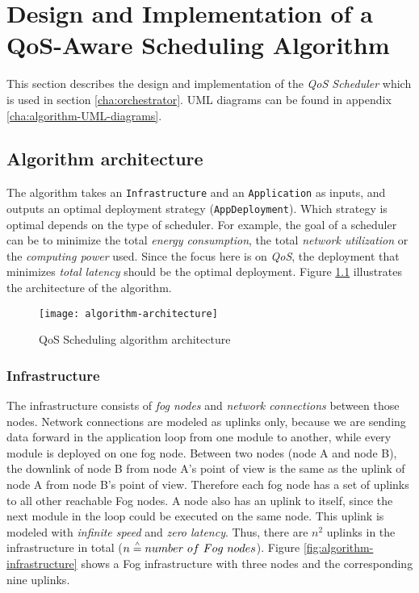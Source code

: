 \chapter{Design and Implementation of a QoS-Aware Scheduling Algorithm\label{cha:algorithm}}

This section describes the design and implementation of the \textit{QoS Scheduler} which is used in section \ref{cha:orchestrator}. UML diagrams can be found in appendix \ref{cha:algorithm-UML-diagrams}.

\section{Algorithm architecture}

The algorithm takes an \texttt{Infrastructure} and an \texttt{Application} as inputs, and outputs an optimal deployment strategy (\texttt{AppDeployment}).
Which strategy is optimal depends on the type of scheduler.
For example, the goal of a scheduler can be to minimize the total \textit{energy consumption}, the total \textit{network utilization} or the \textit{computing power} used.
Since the focus here is on \textit{QoS}, the deployment that minimizes \textit{total latency} should be the optimal deployment.
Figure \ref{fig:algorithm-architecture} illustrates the architecture of the algorithm.

\begin{figure}[h]
    \centering
    \texttt{[image: algorithm-architecture]}
    \caption{QoS Scheduling algorithm architecture}
    \label{fig:algorithm-architecture}
\end{figure}


\subsection{Infrastructure\label{sec:algorithm-infrastructure}}

The infrastructure consists of \textit{fog nodes} and \textit{network connections} between those nodes. Network connections are modeled as uplinks only, because we are sending data forward in the application loop from one module to another, while every module is deployed on one fog node.
Between two nodes (node A and node B), the downlink of node B from node A's point of view is the same as the uplink of node A from node B's point of view. Therefore each fog node has a set of uplinks to all other reachable Fog nodes.
A node also has an uplink to itself, since the next module in the loop could be executed on the same node. This uplink is modeled with \textit{infinite speed} and \textit{zero latency}.
Thus, there are \(n^2\) uplinks in the infrastructure in total ($n \overset{\scriptscriptstyle\wedge}{=} number\ of\ Fog\ nodes$).
Figure \ref{fig:algorithm-infrastructure} shows a Fog infrastructure with three nodes and the corresponding nine uplinks.

